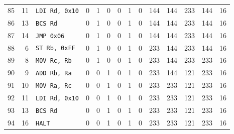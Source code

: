 \begin{longtable}{rrlcccccc r rrrr}
85 & 11 & \texttt{LDI Rd, 0x10} & 0 & 1 & 0 & 0 & 1 & 0 & 144 & 144 & 233 & 144 & 16 \\
86 & 13 & \texttt{BCS Rd} & 0 & 1 & 0 & 0 & 1 & 0 & 144 & 144 & 233 & 144 & 16 \\
87 & 14 & \texttt{JMP 0x06} & 0 & 1 & 0 & 0 & 1 & 0 & 144 & 144 & 233 & 144 & 16 \\
88 & 6 & \texttt{ST Rb, 0xFF} & 0 & 1 & 0 & 0 & 1 & 0 & 233 & 144 & 233 & 144 & 16 \\
89 & 8 & \texttt{MOV Rc, Rb} & 0 & 1 & 0 & 0 & 1 & 0 & 233 & 144 & 233 & 233 & 16 \\
90 & 9 & \texttt{ADD Rb, Ra} & 0 & 0 & 1 & 0 & 1 & 0 & 233 & 144 & 121 & 233 & 16 \\
91 & 10 & \texttt{MOV Ra, Rc} & 0 & 0 & 1 & 0 & 1 & 0 & 233 & 233 & 121 & 233 & 16 \\
92 & 11 & \texttt{LDI Rd, 0x10} & 0 & 0 & 1 & 0 & 1 & 0 & 233 & 233 & 121 & 233 & 16 \\
93 & 13 & \texttt{BCS Rd} & 0 & 0 & 1 & 0 & 1 & 0 & 233 & 233 & 121 & 233 & 16 \\
94 & 16 & \texttt{HALT} & 0 & 0 & 1 & 0 & 1 & 0 & 233 & 233 & 121 & 233 & 16 \\
\end{longtable}
